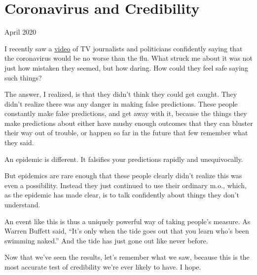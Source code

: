 \chapter{Coronavirus and Credibility}

April 2020

I recently saw a
\href{https://www.youtube.com/watch?v=NAh4uS4f78o}{video} of TV
journalists and politicians confidently saying that the coronavirus
would be no worse than the flu. What struck me about it was not just how
mistaken they seemed, but how daring. How could they feel safe saying
such things?

The answer, I realized, is that they didn't think they could get caught.
They didn't realize there was any danger in making false predictions.
These people constantly make false predictions, and get away with it,
because the things they make predictions about either have mushy enough
outcomes that they can bluster their way out of trouble, or happen so
far in the future that few remember what they said.

An epidemic is different. It falsifies your predictions rapidly and
unequivocally.

But epidemics are rare enough that these people clearly didn't realize
this was even a possibility. Instead they just continued to use their
ordinary m.o., which, as the epidemic has made clear, is to talk
confidently about things they don't understand.

An event like this is thus a uniquely powerful way of taking people's
measure. As Warren Buffett said, ``It's only when the tide goes out that
you learn who's been swimming naked.'' And the tide has just gone out
like never before.

Now that we've seen the results, let's remember what we saw, because
this is the most accurate test of credibility we're ever likely to have.
I hope.